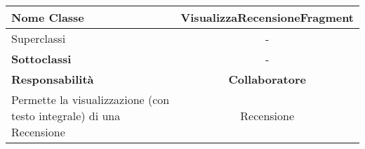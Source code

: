 
\setcounter{table}{0}
\begin{table}[H]
    \centering
    \begin{tabularx}{\textwidth}{||   X  ||  c   ||}
        \hline
        \rowcolor{Gray}
        \textbf{Nome Classe} & VisualizzaRecensioneFragment\\
        \hline
        Superclassi  &  - \\
        \hline
        \textbf{Sottoclassi} & - \\
        \hline
        \hline
         \textbf{Responsabilità} & \textbf{Collaboratore} \\
         \hline
          Permette la visualizzazione (con testo integrale) di una Recensione  & Recensione \\
         \hline
    \end{tabularx}
\end{table}
